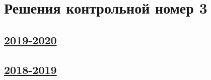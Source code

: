 \thispagestyle{empty}
\section{Решения контрольной номер 3}



\subsection[2019-2020]{\hyperref[sec:kr_03_2019_2020]{2019-2020}}
\label{sec:sol_kr_03_2019_2020}



\subsection[2018-2019]{\hyperref[sec:kr_03_2018_2019]{2018-2019}}
\label{sec:sol_kr_03_2018_2019}
